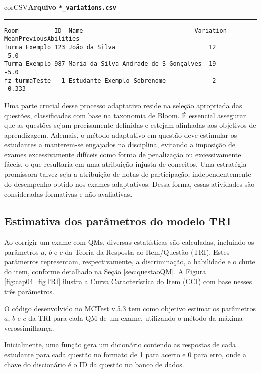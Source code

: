 \begin{myboxCode}{corCSV}{\textbf{Arquivo \texttt{*\_variations.csv}}}\vspace{3mm}
\hrule
\begin{verbatim}
Room          ID  Name                               Variation  MeanPreviousAbilities
Turma Exemplo 123 João da Silva                          12        -5.0
Turma Exemplo 987 Maria da Silva Andrade de S Gonçalves  19        -5.0
fz-turmaTeste   1 Estudante Exemplo Sobrenome             2        -0.333
\end{verbatim}
\end{myboxCode}


Uma parte crucial desse processo adaptativo reside na seleção apropriada das questões, classificadas com base na taxonomia de Bloom. É essencial assegurar que as questões sejam precisamente definidas e estejam alinhadas aos objetivos de aprendizagem. Ademais, o método adaptativo em questão deve estimular os estudantes a manterem-se engajados na disciplina, evitando a imposição de exames excessivamente difíceis como forma de penalização ou excessivamente fáceis, o que resultaria em uma atribuição injusta de conceitos. Uma estratégia promissora talvez seja a atribuição de notas de participação, independentemente do desempenho obtido nos exames adaptativos. Dessa forma, essas atividades são consideradas formativas e não avaliativas.

\subsection{Estimativa dos parâmetros do modelo TRI}\label{sec:estimativas_TRI}

Ao corrigir um exame com QMs, diversas estatísticas são calculadas, incluindo os parâmetros $a$, $b$ e $c$ da Teoria da Resposta ao Item/Questão (TRI). Estes parâmetros representam, respectivamente, a discriminação, a habilidade e o chute do item, conforme detalhado na Seção \ref{sec:questaoQM}. A Figura \ref{fig:cap04_figTRI} ilustra a Curva Característica do Item (CCI) com base nesses três parâmetros.

O código desenvolvido no MCTest v.5.3 tem como objetivo estimar os parâmetros $a$, $b$ e $c$ da TRI para cada QM de um exame, utilizando o método da máxima verossimilhança.

Inicialmente, uma função gera um dicionário contendo as respostas de cada estudante para cada questão no formato de 1 para acerto e 0 para erro, onde a chave do discionário é o ID da questão no banco de dados.

